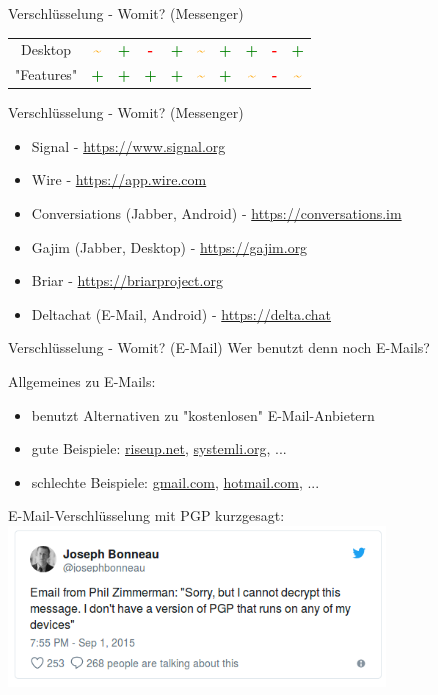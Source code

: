 \documentclass{beamer}
\begin{document}
\begin{frame}{Verschlüsselung - Womit? (Messenger)}
\begin{tabular}{c|ccccccccc}
        {\small Desktop} & \textcolor{orange}{\bf\Huge\textasciitilde} & \textcolor{green}{\bf\Huge+} & \textcolor{red}{\bf\Huge-} & \textcolor{green}{\bf\Huge+} & \textcolor{orange}{\bf\Huge\textasciitilde} & \textcolor{green}{\bf\Huge+} & \textcolor{green}{\bf\Huge+} & \textcolor{red}{\bf\Huge-} & \textcolor{green}{\bf\Huge+} \\
        {\small "Features"} & \textcolor{green}{\bf\Huge+} & \textcolor{green}{\bf\Huge+} & \textcolor{green}{\bf\Huge+} & \textcolor{green}{\bf\Huge+} & \textcolor{orange}{\bf\Huge\textasciitilde} & \textcolor{green}{\bf\Huge+} & \textcolor{orange}{\bf\Huge\textasciitilde} & \textcolor{red}{\bf\Huge-} & \textcolor{orange}{\bf\Huge\textasciitilde} \\
    \end{tabular}
\end{frame}

\begin{frame}{Verschlüsselung - Womit? (Messenger)}
    \begin{itemize}
        \item Signal - \url{https://www.signal.org}
        \item Wire - \url{https://app.wire.com}
        \item Conversiations (Jabber, Android) - \url{https://conversations.im}
        \item Gajim (Jabber, Desktop) - \url{https://gajim.org}
        \item Briar - \url{https://briarproject.org}
        \item Deltachat (E-Mail, Android) - \url{https://delta.chat}
    \end{itemize}
\end{frame}

\begin{frame}{Verschlüsselung - Womit? (E-Mail)}
	Wer benutzt denn noch E-Mails? \\\pause
	\hspace{1cm}
	
	Allgemeines zu E-Mails:
	\begin{itemize}
		\item benutzt Alternativen zu "kostenlosen" E-Mail-Anbietern
		\item gute Beispiele: \url{riseup.net}, \url{systemli.org}, ...
		\item schlechte Beispiele: \url{gmail.com}, \url{hotmail.com}, ...
	\end{itemize}
	\hspace{1cm}\pause
	
	E-Mail-Verschlüsselung mit PGP kurzgesagt:\\
	\includegraphics[width=10cm]{phil.png}
\end{frame}
\end{document}
